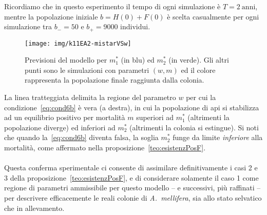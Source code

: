 Ricordiamo che in questo esperimento il
tempo di ogni simulazione è $T=2~\text{anni}$, mentre la popolazione iniziale $b=H(0)+F(0)$ è scelta
casualmente per ogni simulazione tra $b_-=50$ e $b_+ =9000$ individui.

\begin{figure}[!h]
    \centering
    \texttt{[image: img/k11EA2-mistarVSw]}

    \caption[Esperimento A, soglie di mortalità]{Previsioni del modello per $m_1^*$ (in blu) ed $m_2^*$ (in verde).
        Gli altri punti sono le simulazioni con parametri $(w,m)$ ed il colore rappresenta la popolazione
        finale raggiunta dalla colonia.
    }

    \label{img:kh11expA24}
\end{figure}

La linea tratteggiata delimita la regione del parametro $w$ per cui la condizione~\eqref{eq:cond6b} è vera (a destra),
in cui la popolazione di api si stabilizza ad un equilibrio positivo per mortalità $m$ superiori ad $m_1^*$
(altrimenti la popolazione diverge) ed inferiori ad $m_2^*$ (altrimenti la colonia si estingue).
Si noti che quando la~\eqref{eq:cond6b} diventa falsa, la soglia $m_2^*$ funge
da limite \emph{inferiore} alla mortalità, come affermato nella proposizione~\ref{teo:esistenzPosF}.

\paragraph{}
Questa conferma sperimentale ci consente di assimilare definitivamente i casi 2 e 3 della
proposizione~\ref{teo:esistenzPosF}, e di considerare solamente il caso 1 come regione di parametri ammissibile
per questo modello -- e successivi, più raffinati -- per descrivere efficacemente le reali colonie di \emph{A.~mellifera},
sia allo stato selvatico che in allevamento.
